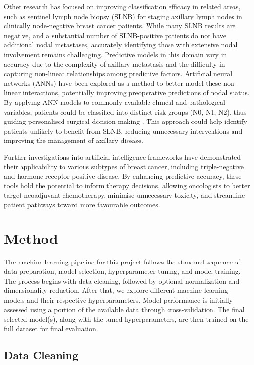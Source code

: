 \documentclass{article}
\begin{document}
Other research has focused on improving classification efficacy in related areas, such as sentinel lymph node biopsy (SLNB) for staging axillary lymph nodes in clinically node-negative breast cancer patients. While many SLNB results are negative, and a substantial number of SLNB-positive patients do not have additional nodal metastases, accurately identifying those with extensive nodal involvement remains challenging. Predictive models in this domain vary in accuracy due to the complexity of axillary metastasis and the difficulty in capturing non-linear relationships among predictive factors. Artificial neural networks (ANNs) have been explored as a method to better model these non-linear interactions, potentially improving preoperative predictions of nodal status. By applying ANN models to commonly available clinical and pathological variables, patients could be classified into distinct risk groups (N0, N1, N2), thus guiding personalised surgical decision-making \cite{Dihge2019}. This approach could help identify patients unlikely to benefit from SLNB, reducing unnecessary interventions and improving the management of axillary disease.

Further investigations into artificial intelligence frameworks have demonstrated their applicability to various subtypes of breast cancer, including triple-negative and hormone receptor-positive disease. By enhancing predictive accuracy, these tools hold the potential to inform therapy decisions, allowing oncologists to better target neoadjuvant chemotherapy, minimise unnecessary toxicity, and streamline patient pathways toward more favourable outcomes.

\section{Method}

The machine learning pipeline for this project follows the standard sequence of data preparation, model selection, hyperparameter tuning, and model training. The process begins with data cleaning, followed by optional normalization and dimensionality reduction. After that, we explore different machine learning models and their respective hyperparameters. Model performance is initially assessed using a portion of the available data through cross-validation. The final selected model(s), along with the tuned hyperparameters, are then trained on the full dataset for final evaluation.

\subsection{Data Cleaning}
\end{document}
